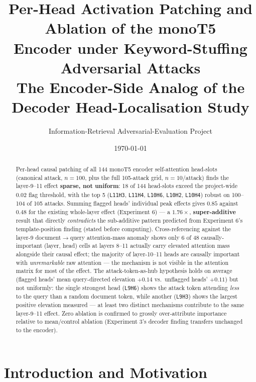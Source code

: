 \documentclass[11pt]{article}
\title{\textbf{Per-Head Activation Patching and Ablation of the monoT5 \\[2pt]
Encoder under Keyword-Stuffing Adversarial Attacks} \\[6pt]
\large The Encoder-Side Analog of the Decoder Head-Localisation Study}
\author{Information-Retrieval Adversarial-Evaluation Project}
\date{\today}
\begin{document}
\maketitle

\begin{abstract}
Per-head causal patching of all 144 monoT5 encoder self-attention head-slots
(canonical attack, $n{=}100$, plus the full 105-attack grid, $n{=}10$/attack) finds the
layer-9--11 effect \textbf{sparse, not uniform}: 18 of 144 head-slots exceed the
project-wide 0.02 flag threshold, with the top 5 (\texttt{L11H3}, \texttt{L11H4},
\texttt{L10H6}, \texttt{L10H2}, \texttt{L10H4}) robust on 100--104 of 105 attacks. Summing
flagged heads' individual peak effects gives $0.85$ against $0.48$ for the existing
whole-layer effect (Experiment 6) — a $1.76\times$, \textbf{super-additive} result that
directly \emph{contradicts} the sub-additive pattern predicted from Experiment 6's
template-position finding (stated before computing). Cross-referencing against the
layer-9 document$\to$query attention-mass anomaly shows only 6 of 48 causally-important
(layer, head) cells at layers 8--11 actually carry elevated attention mass alongside their
causal effect; the majority of layer-10--11 heads are causally important with
\emph{unremarkable} raw attention — the mechanism is not visible in the attention
matrix for most of the effect. The attack-token-as-hub hypothesis holds on average
(flagged heads' mean query-directed elevation $+0.14$ vs.\ unflagged heads' $+0.11$) but
not uniformly: the single strongest head (\texttt{L9H6}) shows the attack token attending
\emph{less} to the query than a random document token, while another (\texttt{L9H3})
shows the largest positive elevation measured — at least two distinct mechanisms
contribute to the same layer-9--11 effect. Zero ablation is confirmed to grossly
over-attribute importance relative to mean/control ablation (Experiment 3's decoder
finding transfers unchanged to the encoder).
\end{abstract}

\tableofcontents
\newpage

\section{Introduction and Motivation}
\end{document}
